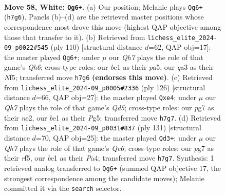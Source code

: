 \documentclass[11pt]{article}
\begin{document}
\clearpage

\begin{figure}[p]\centering
\begin{subfigure}{0.46\textwidth}\centering
\resizebox{\linewidth}{!}{%
\newchessgame
\chessboard[
  setfen={1r4r1/p5pQ/2k4p/3p3P/p2P2P1/q3P3/7K/4bN2 w - - 24 58},
  showmover=false,
  pgfstyle=straightmove, color=movearrow, markmove={h7-g6}
]}
\caption{}
\end{subfigure}\hfill
\begin{subfigure}{0.46\textwidth}\centering
\resizebox{\linewidth}{!}{%
\newchessgame
\chessboard[
  setfen={4nrk1/8/p4p1Q/p1Pp1N2/3Pp3/7P/6P1/6K1 w - - 0 56},
  showmover=false,
  pgfstyle=straightmove, color=movearrow, markmove={h6-g6}
]}
\caption{}
\end{subfigure}
\\[4pt]
\begin{subfigure}{0.46\textwidth}\centering
\resizebox{\linewidth}{!}{%
\newchessgame
\chessboard[
  setfen={4rb1k/1p4pp/p7/3Q1PP1/1P2r3/P4K2/4n3/8 w - - 3 64},
  showmover=false,
  pgfstyle=straightmove, color=movearrow, markmove={d5-e4}
]}
\caption{}
\end{subfigure}\hfill
\begin{subfigure}{0.46\textwidth}\centering
\resizebox{\linewidth}{!}{%
\newchessgame
\chessboard[
  setfen={4k3/6p1/3KP2p/1p3R2/pP3R2/P3q3/8/8 b - - 7 66},
  showmover=false,
  pgfstyle=straightmove, color=movearrow, markmove={e3-d3}
]}
\caption{}
\end{subfigure}
\caption{\textbf{Move 58, White: \texttt{Qg6+}.} (a) Our position; Melanie plays \texttt{Qg6+} (\texttt{h7g6}). Panels (b)--(d) are the retrieved master positions whose correspondence most drove this move (highest QAP objective among those that transfer to it). (b) Retrieved from \texttt{lichess\_elite\_2024-09\_p0022\#545} (ply 110) [structural distance $d$=62, QAP obj=17]: the master played \texttt{Qg6+}; under $\mu$ our \emph{Qh7} plays the role of that game's \emph{Qh6}; cross-type roles: our \emph{b}e1 as their \emph{p}a5, our \emph{q}a3 as their \emph{N}f5; transferred move \texttt{h7g6} \textbf{(endorses this move)}. (c) Retrieved from \texttt{lichess\_elite\_2024-09\_p0005\#2336} (ply 126) [structural distance $d$=66, QAP obj=27]: the master played \texttt{Qxe4}; under $\mu$ our \emph{Qh7} plays the role of that game's \emph{Qd5}; cross-type roles: our \emph{p}g7 as their \emph{n}e2, our \emph{b}e1 as their \emph{P}g5; transferred move \texttt{h7g7}. (d) Retrieved from \texttt{lichess\_elite\_2024-09\_p0031\#837} (ply 131) [structural distance $d$=70, QAP obj=25]: the master played \texttt{Qd3+}; under $\mu$ our \emph{Qh7} plays the role of that game's \emph{Qe6}; cross-type roles: our \emph{p}g7 as their \emph{r}f5, our \emph{b}e1 as their \emph{P}a4; transferred move \texttt{h7g7}. Synthesis: 1 retrieved analog transferred to \texttt{Qg6+} (summed QAP objective 17, the strongest correspondence among the candidate moves); Melanie committed it via the \texttt{search} selector.}
\label{fig:thought-m114}
\end{figure}
\end{document}
